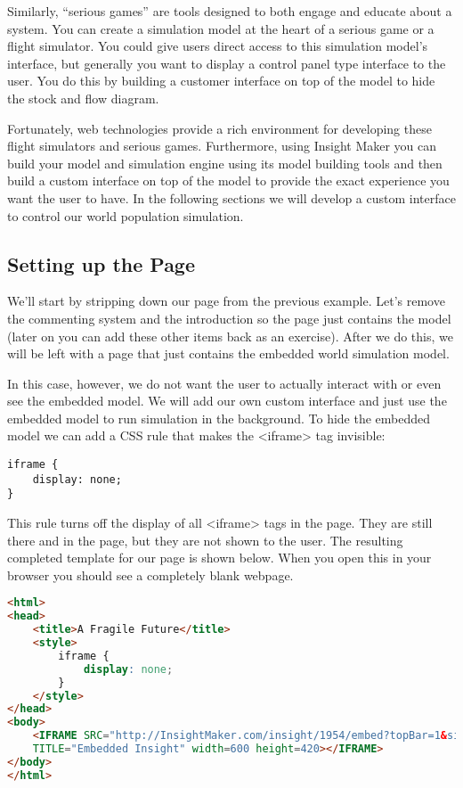 \documentclass[]{memoir}
\begin{document}
Similarly, ``serious games'' are tools designed to both engage and
educate about a system. You can create a simulation model at the heart
of a serious game or a flight simulator. You could give users direct
access to this simulation model's interface, but generally you want to
display a control panel type interface to the user. You do this by
building a customer interface on top of the model to hide the stock and
flow diagram.

Fortunately, web technologies provide a rich environment for developing
these flight simulators and serious games. Furthermore, using Insight
Maker you can build your model and simulation engine using its model
building tools and then build a custom interface on top of the model to
provide the exact experience you want the user to have. In the following
sections we will develop a custom interface to control our world
population simulation.

\subsection{Setting up the Page}

We'll start by stripping down our page from the previous example. Let's
remove the commenting system and the introduction so the page just
contains the model (later on you can add these other items back as an
exercise). After we do this, we will be left with a page that just
contains the embedded world simulation model.

In this case, however, we do not want the user to actually interact with
or even see the embedded model. We will add our own custom interface and
just use the embedded model to run simulation in the background. To hide
the embedded model we can add a CSS rule that makes the
\textless{}iframe\textgreater{} tag invisible:

\begin{lstlisting}
iframe {
    display: none;
}
\end{lstlisting}

This rule turns off the display of all \textless{}iframe\textgreater{}
tags in the page. They are still there and in the page, but they are not
shown to the user. The resulting completed template for our page is
shown below. When you open this in your browser you should see a
completely blank webpage.

\begin{lstlisting}[language=HTML]
<html>
<head>
    <title>A Fragile Future</title>
    <style>
        iframe {
            display: none;
        }
    </style>
</head>
<body>
    <IFRAME SRC="http://InsightMaker.com/insight/1954/embed?topBar=1&sideBar=1&zoom=1"
    TITLE="Embedded Insight" width=600 height=420></IFRAME>  
</body>
</html>
\end{lstlisting}
\end{document}
